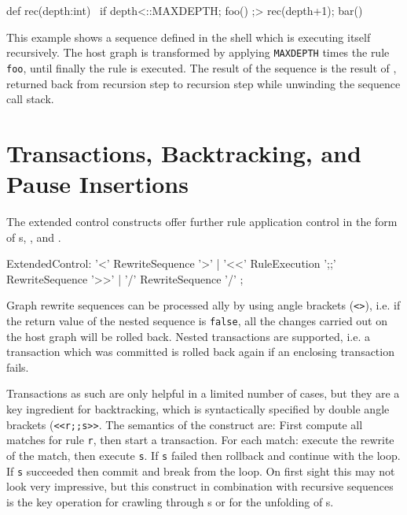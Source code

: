 \begin{example}
\label{ex:recseq}
\begin{grgen}
def rec(depth:int) {\
  if{ {depth<::MAXDEPTH}; foo() ;> rec(depth+1); bar() }\
}
\end{grgen}
This example shows a sequence defined in the shell which is executing itself recursively.
The host graph is transformed by applying \texttt{MAXDEPTH} times the rule \texttt{foo}, until finally the rule  is executed. The result of the sequence is the result of , returned back from recursion step to recursion step while unwinding the sequence call stack. 
\end{example}


\section{Transactions, Backtracking, and Pause Insertions}\label{sec:extctrl}

The extended control constructs offer further rule application control in the form of s, , and .

\begin{rail} 
  ExtendedControl: 
    '<' RewriteSequence '>' | 
    '<<' RuleExecution ';;' RewriteSequence '>>' |
    '/' RewriteSequence '/'
	;
\end{rail}

Graph rewrite sequences can be processed ally by using angle brackets (\texttt{<>}), i.e.
if the return value of the nested sequence is \texttt{false}, all the changes carried out on the host graph will be rolled back.
Nested transactions\indexmainsee{nested transaction}{transaction} are supported, i.e. a transaction which was committed is rolled back again if an enclosing transaction fails.

Transactions as such are only helpful in a limited number of cases, but they are a key ingredient for backtracking, which is syntactically specified by double angle brackets (\texttt{<<r;;s>>}.
The semantics of the construct are:
First compute all matches for rule \texttt{r}, then start a transaction.
For each match: execute the rewrite of the match, then execute \texttt{s}.
If \texttt{s} failed then rollback and continue with the loop.
If \texttt{s} succeeded then commit and break from the loop.
On first sight this may not look very impressive, but this construct in combination with recursive sequences is the key operation for crawling through s or for the unfolding of s.

